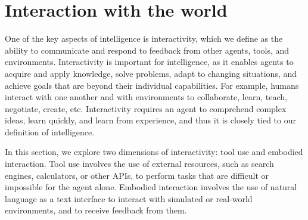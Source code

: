 \section{Interaction with the world}
\label{sec:environment1}
\label{sec:interact}

One of the key aspects of intelligence is interactivity, which we define as the ability to communicate and respond to feedback from other agents, tools, and environments. Interactivity is important for intelligence, as it enables agents to acquire and apply knowledge, solve problems, adapt to changing situations, and achieve goals that are beyond their individual capabilities.
For example, humans interact with one another and with environments to collaborate, learn, teach, negotiate, create, etc. Interactivity requires an agent to comprehend complex ideas, learn quickly, and learn from experience, and thus it is closely tied to our definition of intelligence. 

In this section, we explore two dimensions of interactivity: tool use and embodied interaction. Tool use involves the use of external resources, such as search engines, calculators, or other APIs, to perform tasks that are difficult or impossible for the agent alone. Embodied interaction involves the use of natural language as a text interface to interact with simulated or real-world environments, and to receive feedback from them. 

